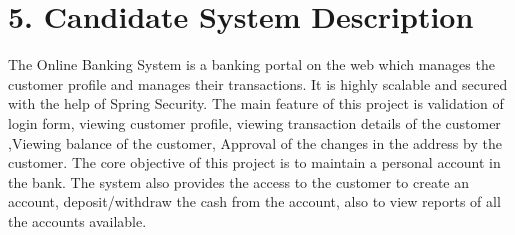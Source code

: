 \documentclass[letterpaper, 11pt]{report}
\begin{document}
\section*{5. Candidate System Description}
\normalsize {The Online Banking System is a banking portal on the web which manages the customer profile and manages their transactions. It is highly scalable and secured with the help of Spring Security. The main feature of this project is validation of login form, viewing customer proﬁle, viewing transaction details of the customer ,Viewing balance of the customer, Approval of the changes in the address by the customer. The core objective of this project is to maintain a personal account in the bank. The system also provides the access to the customer to create an account, deposit/withdraw the cash from the account, also to view reports of all the accounts available. }\\

\end{document}
